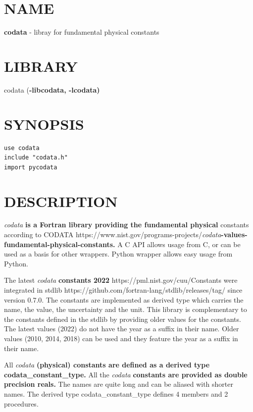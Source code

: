 \section{NAME}

\textbf{codata }- libray for fundamental physical constants

\section{LIBRARY}

codata (\textbf{-libcodata, -lcodata)}

\section{SYNOPSIS}

\begin{verbatim}
use codata
include "codata.h"
import pycodata
\end{verbatim}

\section{DESCRIPTION}

\emph{codata}\textbf{ is a Fortran library providing the fundamental
physical} constants according to CODATA
https://www.nist.gov/programs-projects/\emph{codata}\textbf{-values-fundamental-physical-constants.}
A C API allows usage from C, or can be used as a basis for other
wrappers. Python wrapper allows easy usage from Python.

The latest \emph{codata}\textbf{ constants 2022}
https://pml.nist.gov/cuu/Constants were integrated in stdlib
https://github.com/fortran-lang/stdlib/releases/tag/ since version
0.7.0. The constants are implemented as derived type which carries the
name, the value, the uncertainty and the unit. This library is
complementary to the constants defined in the stdlib by providing older
values for the constants. The latest values (2022) do not have the year
as a suffix in their name. Older values (2010, 2014, 2018) can be used
and they feature the year as a suffix in their name.

All \emph{codata}\textbf{ (physical) constants are defined as a derived
type codata\_constant\_type.} All the \emph{codata}\textbf{ constants
are provided as double precision reals.} The names are quite long and
can be aliased with shorter names. The derived type
codata\_constant\_type defines 4 members and 2 procedures.

